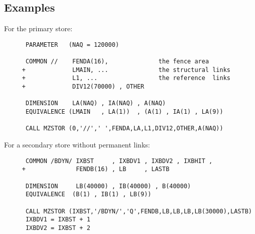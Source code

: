 \subsection{Examples}
\par For the primary store:
\begin{verbatim}
      PARAMETER   (NAQ = 120000)
 
      COMMON //    FENDA(16),              the fence area
     +             LMAIN, ...              the structural links
     +             L1, ...                 the reference  links
     +             DIV12(70000) , OTHER
 
      DIMENSION    LA(NAQ) , IA(NAQ) , A(NAQ)
      EQUIVALENCE (LMAIN   , LA(1))  , (A(1) , IA(1) , LA(9))
 
      CALL MZSTOR (0,'//',' ',FENDA,LA,L1,DIV12,OTHER,A(NAQ))
\end{verbatim}
\par For a secondary store without permanent links:
\begin{verbatim}
      COMMON /BDYN/ IXBST     , IXBDV1 , IXBDV2 , IXBHIT ,
     +              FENDB(16) , LB     , LASTB
 
      DIMENSION     LB(40000) , IB(40000) , B(40000)
      EQUIVALENCE  (B(1) , IB(1) , LB(9))
 
      CALL MZSTOR (IXBST,'/BDYN/','Q',FENDB,LB,LB,LB,LB(30000),LASTB)
      IXBDV1 = IXBST + 1
      IXBDV2 = IXBST + 2
\end{verbatim}
